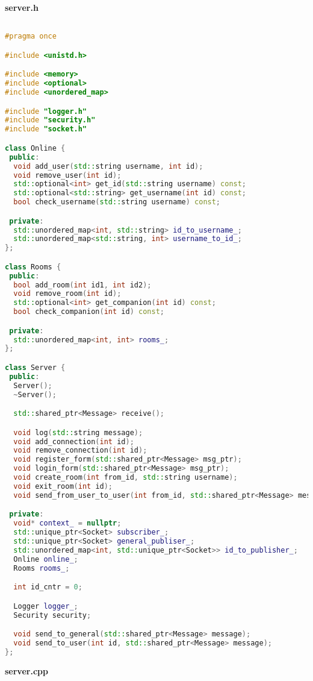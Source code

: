 \textbf{server.h}

\begin{lstlisting}[language=C++]

#pragma once

#include <unistd.h>

#include <memory>
#include <optional>
#include <unordered_map>

#include "logger.h"
#include "security.h"
#include "socket.h"

class Online {
 public:
  void add_user(std::string username, int id);
  void remove_user(int id);
  std::optional<int> get_id(std::string username) const;
  std::optional<std::string> get_username(int id) const;
  bool check_username(std::string username) const;

 private:
  std::unordered_map<int, std::string> id_to_username_;
  std::unordered_map<std::string, int> username_to_id_;
};

class Rooms {
 public:
  bool add_room(int id1, int id2);
  void remove_room(int id);
  std::optional<int> get_companion(int id) const;
  bool check_companion(int id) const;

 private:
  std::unordered_map<int, int> rooms_;
};

class Server {
 public:
  Server();
  ~Server();

  std::shared_ptr<Message> receive();

  void log(std::string message);
  void add_connection(int id);
  void remove_connection(int id);
  void register_form(std::shared_ptr<Message> msg_ptr);
  void login_form(std::shared_ptr<Message> msg_ptr);
  void create_room(int from_id, std::string username);
  void exit_room(int id);
  void send_from_user_to_user(int from_id, std::shared_ptr<Message> message);

 private:
  void* context_ = nullptr;
  std::unique_ptr<Socket> subscriber_;
  std::unique_ptr<Socket> general_publiser_;
  std::unordered_map<int, std::unique_ptr<Socket>> id_to_publisher_;
  Online online_;
  Rooms rooms_;

  int id_cntr = 0;

  Logger logger_;
  Security security;

  void send_to_general(std::shared_ptr<Message> message);
  void send_to_user(int id, std::shared_ptr<Message> message);
};


\end{lstlisting}

\textbf{server.cpp}

